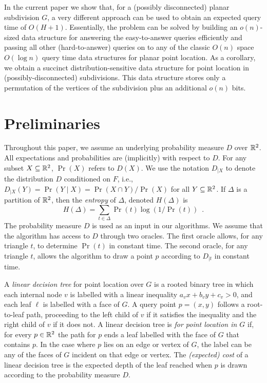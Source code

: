 \documentclass{patmorin}
\begin{document}
In the current paper we show that, for a (possibly disconnected)
planar subdivision $G$, a very different approach can be used to obtain
an expected query time of $O(H+1)$. Essentially, the problem can be
solved by building an $o(n)$-sized data structure for answering the
easy-to-answer queries efficiently and passing all other (hard-to-answer)
queries on to any of the classic $O(n)$ space $O(\log n)$ query time
data structures for planar point location. As a corollary, we obtain
a succinct distribution-sensitive data structure for point location in
(possibly-disconnected) subdivisions.  This data structure stores only
a permutation of the vertices of the subdivision plus an additional
$o(n)$ bits.

\section{Preliminaries}

Throughout this paper, we assume an underlying probability measure $D$
over $\mathbb{R}^2$.  All expectations and probabilities are (implicitly) with
respect to $D$.  For any subset $X\subseteq\mathbb{R}^2$, $\Pr(X)$ refers to
$D(X)$.  We use the notation $D_{|X}$ to denote the distribution $D$ conditioned on $F$, i.e., $D_{|X}(Y)=\Pr(Y\mid X)=\Pr(X\cap Y)/\Pr(X)$ for all $Y\subseteq\mathbb{R}^2$.
If $\Delta$ is a partition of $\mathbb{R}^2$, then the \emph{entropy}
of $\Delta$, denoted $H(\Delta)$ is
\[
    H(\Delta) = \sum_{t\in \Delta} \Pr(t)\log(1/\Pr(t)) \enspace .
\]
The probability measure $D$ is used as an input in our algorithms.
We assume that the algorithm has access to $D$ through two oracles.
The first oracle allows, for any triangle $t$, to determine $\Pr(t)$
in constant time.  The second oracle, for any triangle $t$, allows the
algorithm to draw a point $p$ according to $D_{|t}$ in constant time.

A \emph{linear decision tree} for point location over $G$ is a rooted
binary tree in which each internal node $v$ is labelled with a linear
inequality $a_vx + b_vy + c_v > 0$, and each leaf $\ell$ is labelled
with a face of $G$.  A query point $p=(x,y)$ follows a root-to-leaf path,
proceeding to the left child of $v$ if it satisfies the inequality and the
right child of $v$ if it does not.  A linear decision tree is \emph{for
point location in $G$} if, for every $p\in\mathbb{R}^2$ the path for $p$ ends a
leaf labelled with the face of $G$ that contains $p$. In the case where
$p$ lies on an edge or vertex of $G$, the label can be any of the faces
of $G$ incident on that edge or vertex.  The \emph{(expected) cost} of a
linear decision tree is the expected depth of the leaf reached when $p$
is drawn according to the probability measure $D$.
\end{document}
